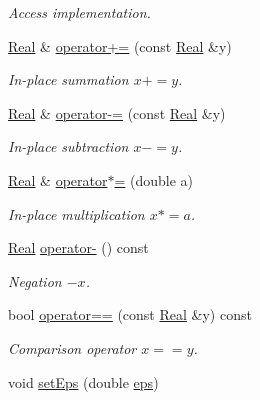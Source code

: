 \begin{DoxyCompactItemize}
\begin{DoxyCompactList}\small\item\em Access implementation. \end{DoxyCompactList}\item 
\hyperlink{classSpacy_1_1Real}{Real} \& \hyperlink{classSpacy_1_1SupportedOperatorBase_a9d52829c0e1fcafab1f2a3de17379633_a9d52829c0e1fcafab1f2a3de17379633}{operator+=} (const \hyperlink{classSpacy_1_1Real}{Real} \&y)
\begin{DoxyCompactList}\small\item\em In-\/place summation $ x+=y$. \end{DoxyCompactList}\item 
\hyperlink{classSpacy_1_1Real}{Real} \& \hyperlink{classSpacy_1_1SupportedOperatorBase_af21496412c35e4afa59779b4fe1b67d5_af21496412c35e4afa59779b4fe1b67d5}{operator-\/=} (const \hyperlink{classSpacy_1_1Real}{Real} \&y)
\begin{DoxyCompactList}\small\item\em In-\/place subtraction $ x-=y$. \end{DoxyCompactList}\item 
\hyperlink{classSpacy_1_1Real}{Real} \& \hyperlink{classSpacy_1_1SupportedOperatorBase_a15adabb20b53d84a79982b0668a67f68_a15adabb20b53d84a79982b0668a67f68}{operator$\ast$=} (double a)
\begin{DoxyCompactList}\small\item\em In-\/place multiplication $ x*=a$. \end{DoxyCompactList}\item 
\hyperlink{classSpacy_1_1Real}{Real} \hyperlink{classSpacy_1_1SupportedOperatorBase_a0adcaddc24efbbdccbd891df99971c6c_a0adcaddc24efbbdccbd891df99971c6c}{operator-\/} () const
\begin{DoxyCompactList}\small\item\em Negation $ -x$. \end{DoxyCompactList}\item 
bool \hyperlink{classSpacy_1_1SupportedOperatorBase_aa493a6ea82feb3480a1c83395a0a7c3a_aa493a6ea82feb3480a1c83395a0a7c3a}{operator==} (const \hyperlink{classSpacy_1_1Real}{Real} \&y) const
\begin{DoxyCompactList}\small\item\em Comparison operator $ x==y$. \end{DoxyCompactList}\item 
void \hyperlink{classSpacy_1_1Mixin_1_1Eps_a1bbfd62541610d5d80f2782ab77158e4_a1bbfd62541610d5d80f2782ab77158e4}{set\+Eps} (double \hyperlink{classSpacy_1_1Mixin_1_1Eps_a40e2ba8f3abd2b5370ef41238cfaaf8b_a40e2ba8f3abd2b5370ef41238cfaaf8b}{eps})

\end{DoxyCompactItemize}
